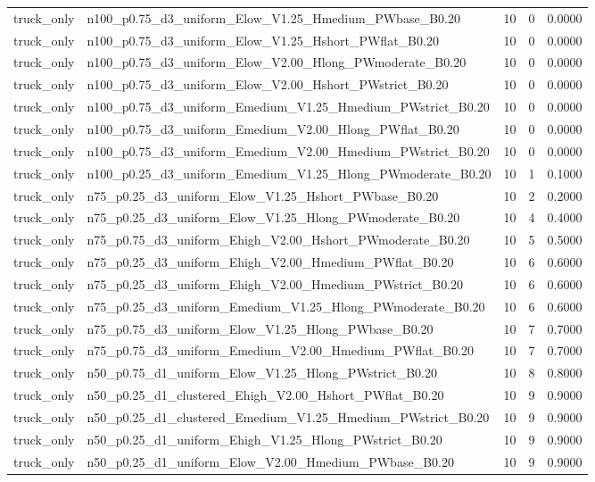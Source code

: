 \begin{tabular}{llrrr}
truck_only & n100_p0.75_d3_uniform_Elow_V1.25_Hmedium_PWbase_B0.20 & 10 & 0 & 0.0000 \\
truck_only & n100_p0.75_d3_uniform_Elow_V1.25_Hshort_PWflat_B0.20 & 10 & 0 & 0.0000 \\
truck_only & n100_p0.75_d3_uniform_Elow_V2.00_Hlong_PWmoderate_B0.20 & 10 & 0 & 0.0000 \\
truck_only & n100_p0.75_d3_uniform_Elow_V2.00_Hshort_PWstrict_B0.20 & 10 & 0 & 0.0000 \\
truck_only & n100_p0.75_d3_uniform_Emedium_V1.25_Hmedium_PWstrict_B0.20 & 10 & 0 & 0.0000 \\
truck_only & n100_p0.75_d3_uniform_Emedium_V2.00_Hlong_PWflat_B0.20 & 10 & 0 & 0.0000 \\
truck_only & n100_p0.75_d3_uniform_Emedium_V2.00_Hmedium_PWstrict_B0.20 & 10 & 0 & 0.0000 \\
truck_only & n100_p0.25_d3_uniform_Emedium_V1.25_Hlong_PWmoderate_B0.20 & 10 & 1 & 0.1000 \\
truck_only & n75_p0.25_d3_uniform_Elow_V1.25_Hshort_PWbase_B0.20 & 10 & 2 & 0.2000 \\
truck_only & n75_p0.25_d3_uniform_Elow_V1.25_Hlong_PWmoderate_B0.20 & 10 & 4 & 0.4000 \\
truck_only & n75_p0.75_d3_uniform_Ehigh_V2.00_Hshort_PWmoderate_B0.20 & 10 & 5 & 0.5000 \\
truck_only & n75_p0.25_d3_uniform_Ehigh_V2.00_Hmedium_PWflat_B0.20 & 10 & 6 & 0.6000 \\
truck_only & n75_p0.25_d3_uniform_Ehigh_V2.00_Hmedium_PWstrict_B0.20 & 10 & 6 & 0.6000 \\
truck_only & n75_p0.25_d3_uniform_Emedium_V1.25_Hlong_PWmoderate_B0.20 & 10 & 6 & 0.6000 \\
truck_only & n75_p0.75_d3_uniform_Elow_V1.25_Hlong_PWbase_B0.20 & 10 & 7 & 0.7000 \\
truck_only & n75_p0.75_d3_uniform_Emedium_V2.00_Hmedium_PWflat_B0.20 & 10 & 7 & 0.7000 \\
truck_only & n50_p0.75_d1_uniform_Elow_V1.25_Hlong_PWstrict_B0.20 & 10 & 8 & 0.8000 \\
truck_only & n50_p0.25_d1_clustered_Ehigh_V2.00_Hshort_PWflat_B0.20 & 10 & 9 & 0.9000 \\
truck_only & n50_p0.25_d1_clustered_Emedium_V1.25_Hmedium_PWstrict_B0.20 & 10 & 9 & 0.9000 \\
truck_only & n50_p0.25_d1_uniform_Ehigh_V1.25_Hlong_PWstrict_B0.20 & 10 & 9 & 0.9000 \\
truck_only & n50_p0.25_d1_uniform_Elow_V2.00_Hmedium_PWbase_B0.20 & 10 & 9 & 0.9000 \\

\end{tabular}
